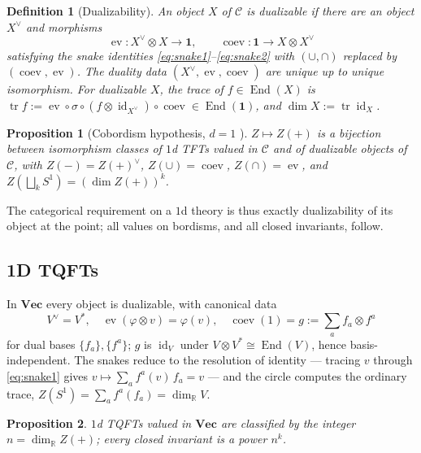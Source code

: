 \documentclass[prl,aps,10pt,superscriptaddress, floatfix]{revtex4-2}
\newtheorem{prop}{Proposition}
\newtheorem*{defi}{Definition}
\begin{document}
\begin{defi}[Dualizability]
An object $X$ of $\mathcal C$ is \emph{dualizable} if there are an object $X^\vee$ and morphisms
\[
\operatorname{ev}:X^\vee\otimes X\to\mathbf 1,\qquad
\operatorname{coev}:\mathbf 1\to X\otimes X^\vee
\]
satisfying the snake identities \eqref{eq:snake1}--\eqref{eq:snake2} with $(\cup,\cap)$ replaced by $(\operatorname{coev},\operatorname{ev})$. The \emph{duality data} $(X^\vee,\operatorname{ev},\operatorname{coev})$ are unique up to unique isomorphism. For dualizable $X$, the \emph{trace} of $f\in\operatorname{End}(X)$ is $\operatorname{tr}f:=\operatorname{ev}\circ\sigma\circ(f\otimes\operatorname{id}_{X^\vee})\circ\operatorname{coev}\in\operatorname{End}(\mathbf 1)$, and $\dim X:=\operatorname{tr}\operatorname{id}_X$.
\end{defi}

\begin{prop}[Cobordism hypothesis, $d=1$ \cite{Lurie2009}]\label{prop:cobord1}
$Z\mapsto Z(+)$ is a bijection between isomorphism classes of $1$d TFTs valued in $\mathcal C$ and of dualizable objects of $\mathcal C$, with $Z(-)=Z(+)^\vee$, $Z(\cup)=\operatorname{coev}$, $Z(\cap)=\operatorname{ev}$, and $Z(\bigsqcup_kS^1)=(\dim Z(+))^k$.
\end{prop}

The categorical requirement on a $1$d theory is thus exactly dualizability of its object at the point; all values on bordisms, and all closed invariants, follow.

\subsection{1D TQFTs}

In $\mathbf{Vec}$ every object is dualizable, with canonical data
\[
V^\vee=V^*,\quad
\operatorname{ev}(\varphi\otimes v)=\varphi(v),\quad
\operatorname{coev}(1)=g:=\textstyle\sum_af_a\otimes f^a
\]
for dual bases $\{f_a\},\{f^a\}$; $g$ is $\operatorname{id}_V$ under $V\otimes V^*\cong\operatorname{End}(V)$, hence basis-independent. The snakes reduce to the resolution of identity --- tracing $v$ through \eqref{eq:snake1} gives $v\mapsto\sum_af^a(v)\,f_a=v$ --- and the circle computes the ordinary trace, $Z(S^1)=\sum_af^a(f_a)=\dim_{\mathbb R}V$.

\begin{prop}
$1$d TQFTs valued in $\mathbf{Vec}$ are classified by the integer $n=\dim_{\mathbb R}Z(+)$; every closed invariant is a power $n^k$.
\end{prop}
\end{document}
